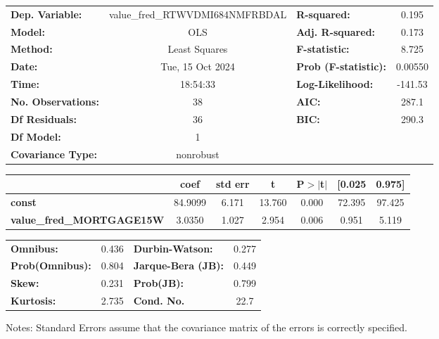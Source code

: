 \begin{center}
\begin{tabular}{lclc}
\toprule
\textbf{Dep. Variable:}           & value\_fred\_RTWVDMI684NMFRBDAL & \textbf{  R-squared:         } &     0.195   \\
\textbf{Model:}                   &               OLS               & \textbf{  Adj. R-squared:    } &     0.173   \\
\textbf{Method:}                  &          Least Squares          & \textbf{  F-statistic:       } &     8.725   \\
\textbf{Date:}                    &         Tue, 15 Oct 2024        & \textbf{  Prob (F-statistic):} &  0.00550    \\
\textbf{Time:}                    &             18:54:33            & \textbf{  Log-Likelihood:    } &   -141.53   \\
\textbf{No. Observations:}        &                  38             & \textbf{  AIC:               } &     287.1   \\
\textbf{Df Residuals:}            &                  36             & \textbf{  BIC:               } &     290.3   \\
\textbf{Df Model:}                &                   1             & \textbf{                     } &             \\
\textbf{Covariance Type:}         &            nonrobust            & \textbf{                     } &             \\
\bottomrule
\end{tabular}
\begin{tabular}{lcccccc}
                                  & \textbf{coef} & \textbf{std err} & \textbf{t} & \textbf{P$> |$t$|$} & \textbf{[0.025} & \textbf{0.975]}  \\
\midrule
\textbf{const}                    &      84.9099  &        6.171     &    13.760  &         0.000        &       72.395    &       97.425     \\
\textbf{value\_fred\_MORTGAGE15W} &       3.0350  &        1.027     &     2.954  &         0.006        &        0.951    &        5.119     \\
\bottomrule
\end{tabular}
\begin{tabular}{lclc}
\textbf{Omnibus:}       &  0.436 & \textbf{  Durbin-Watson:     } &    0.277  \\
\textbf{Prob(Omnibus):} &  0.804 & \textbf{  Jarque-Bera (JB):  } &    0.449  \\
\textbf{Skew:}          &  0.231 & \textbf{  Prob(JB):          } &    0.799  \\
\textbf{Kurtosis:}      &  2.735 & \textbf{  Cond. No.          } &     22.7  \\
\bottomrule
\end{tabular}
\end{center}

Notes: \newline
 [1] Standard Errors assume that the covariance matrix of the errors is correctly specified.